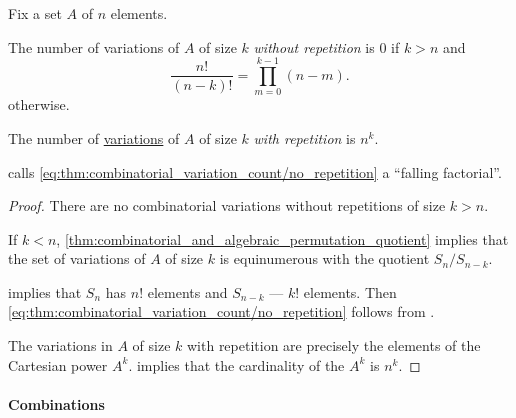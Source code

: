 \begin{proposition}\label{thm:combinatorial_variation_count}
  Fix a set \( A \) of \( n \) elements.

  \begin{thmenum}
     The number of variations of \( A \) of size \( k \) \emph{without repetition} is \( 0 \) if \( k > n \) and
    \begin{equation}\label{eq:thm:combinatorial_variation_count/no_repetition}
      \frac {n!} {(n - k)!} = \prod_{m=0}^{k - 1} (n - m).
    \end{equation}
    otherwise.

     The number of \hyperref[def:combinatorial_variation]{variations} of \( A \) of size \( k \) \emph{with repetition} is \( n^k \).
  \end{thmenum}
\end{proposition}
\begin{comments}
  \item \Textcite[74]{Aigner1997CombinatorialTheory} calls \eqref{eq:thm:combinatorial_variation_count/no_repetition} a \enquote{falling factorial}.
\end{comments}
\begin{proof}
   There are no combinatorial variations without repetitions of size \( k > n \).

  If \( k < n \), \cref{thm:combinatorial_and_algebraic_permutation_quotient} implies that the set of variations of \( A \) of size \( k \) is equinumerous with the quotient \( S_n / S_{n - k} \).

   implies that \( S_n \) has \( n! \) elements and \( S_{n - k} \) --- \( k! \) elements. Then \eqref{eq:thm:combinatorial_variation_count/no_repetition} follows from .

   The variations in \( A \) of size \( k \) with repetition are precisely the elements of the Cartesian power \( A^k \).  implies that the cardinality of the \( A^k \) is \( n^k \).
\end{proof}

\paragraph{Combinations}

